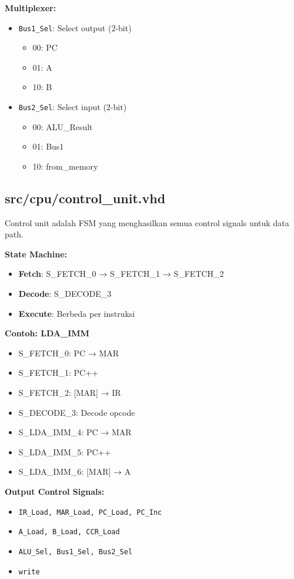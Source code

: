 \documentclass[12pt,a4paper]{report}
\begin{document}
\textbf{Multiplexer:}
\begin{itemize}
  \item \texttt{Bus1\_Sel}: Select output (2-bit)
    \begin{itemize}
      \item 00: PC
      \item 01: A
      \item 10: B
    \end{itemize}
  \item \texttt{Bus2\_Sel}: Select input (2-bit)
    \begin{itemize}
      \item 00: ALU\_Result
      \item 01: Bus1
      \item 10: from\_memory
    \end{itemize}
\end{itemize}

\subsection{src/cpu/control\_unit.vhd}

Control unit adalah FSM yang menghasilkan semua control signals untuk data path.

\textbf{State Machine:}
\begin{itemize}
  \item \textbf{Fetch}: S\_FETCH\_0 → S\_FETCH\_1 → S\_FETCH\_2
  \item \textbf{Decode}: S\_DECODE\_3
  \item \textbf{Execute}: Berbeda per instruksi
\end{itemize}

\textbf{Contoh: LDA\_IMM}
\begin{itemize}
  \item S\_FETCH\_0: PC → MAR
  \item S\_FETCH\_1: PC++
  \item S\_FETCH\_2: [MAR] → IR
  \item S\_DECODE\_3: Decode opcode
  \item S\_LDA\_IMM\_4: PC → MAR
  \item S\_LDA\_IMM\_5: PC++
  \item S\_LDA\_IMM\_6: [MAR] → A
\end{itemize}

\textbf{Output Control Signals:}
\begin{itemize}
  \item \texttt{IR\_Load, MAR\_Load, PC\_Load, PC\_Inc}
  \item \texttt{A\_Load, B\_Load, CCR\_Load}
  \item \texttt{ALU\_Sel, Bus1\_Sel, Bus2\_Sel}
  \item \texttt{write}
\end{itemize}
\end{document}
